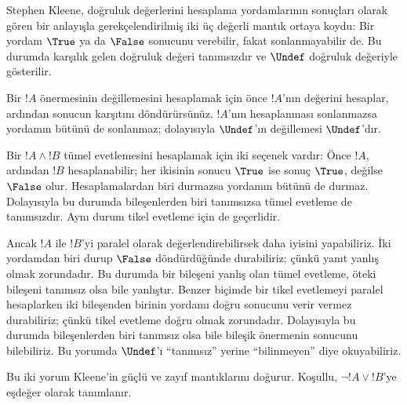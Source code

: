 \documentclass[../../../include/open-logic-section]{subfiles}
\begin{document}


Stephen Kleene, doğruluk değerlerini hesaplama yordamlarının sonuçları olarak
gören bir anlayışla gerekçelendirilmiş iki üç değerli mantık ortaya koydu:
Bir yordam $\True$ ya da $\False$ sonucunu verebilir, fakat sonlanmayabilir
de. Bu durumda karşılık gelen doğruluk değeri tanımsızdır ve $\Undef$
doğruluk değeriyle gösterilir.

Bir $!A$ önermesinin değillemesini hesaplamak için önce $!A$'nın değerini
hesaplar, ardından sonucun karşıtını döndürürsünüz. $!A$'nın hesaplanması
sonlanmazsa yordamın bütünü de sonlanmaz; dolayısıyla $\Undef$'ın
değillemesi $\Undef$'dır.

Bir $!A \land !B$ tümel evetlemesini hesaplamak için iki seçenek vardır:
Önce $!A$, ardından $!B$ hesaplanabilir; her ikisinin sonucu $\True$ ise
sonuç $\True$, değilse $\False$ olur. Hesaplamalardan biri durmazsa yordamın
bütünü de durmaz. Dolayısıyla bu durumda bileşenlerden biri tanımsızsa tümel
evetleme de tanımsızdır. Aynı durum tikel evetleme için de geçerlidir.

Ancak $!A$ ile $!B$'yi paralel olarak değerlendirebilirsek daha iyisini
yapabiliriz. İki yordamdan biri durup $\False$ döndürdüğünde durabiliriz;
çünkü yanıt yanlış olmak zorundadır. Bu durumda bir bileşeni yanlış olan
tümel evetleme, öteki bileşeni tanımsız olsa bile yanlıştır. Benzer biçimde
bir tikel evetlemeyi paralel hesaplarken iki bileşenden birinin yordamı doğru
sonucunu verir vermez durabiliriz; çünkü tikel evetleme doğru olmak
zorundadır. Dolayısıyla bu durumda bileşenlerden biri tanımsız olsa bile
bileşik önermenin sonucunu bilebiliriz. Bu yorumda $\Undef$'ı “tanımsız”
yerine “bilinmeyen” diye okuyabiliriz.

Bu iki yorum Kleene'in güçlü ve zayıf mantıklarını doğurur. Koşullu,
$\lnot !A \lor !B$'ye eşdeğer olarak tanımlanır.
\end{document}
